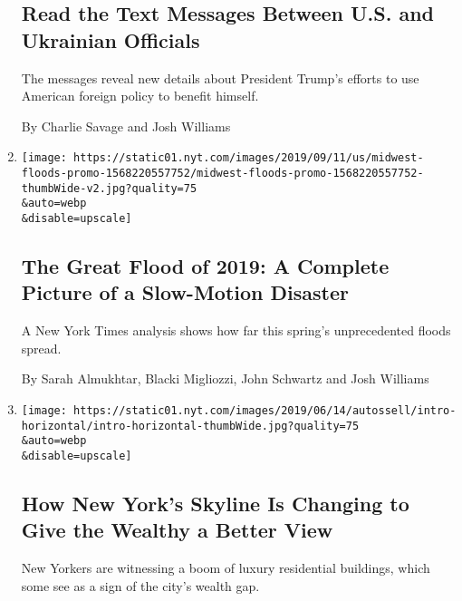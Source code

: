 \begin{enumerate}
  \hypertarget{read-the-text-messages-between-us-and-ukrainian-officials}{%
  \subsection{Read the Text Messages Between U.S. and Ukrainian
  Officials}\label{read-the-text-messages-between-us-and-ukrainian-officials}}

  The messages reveal new details about President Trump's efforts to use
  American foreign policy to benefit himself.

  By Charlie Savage and Josh Williams
\item
  \href{/interactive/2019/09/11/us/midwest-flooding.html}{}

  \texttt{[image: https://static01.nyt.com/images/2019/09/11/us/midwest-floods-promo-1568220557752/midwest-floods-promo-1568220557752-thumbWide-v2.jpg?quality=75\\\&auto=webp\\\&disable=upscale]}

  \hypertarget{the-great-flood-of-2019-a-complete-picture-of-a-slow-motion-disaster}{%
  \subsection{The Great Flood of 2019: A Complete Picture of a
  Slow-Motion
  Disaster}\label{the-great-flood-of-2019-a-complete-picture-of-a-slow-motion-disaster}}

  A New York Times analysis shows how far this spring's unprecedented
  floods spread.

  By Sarah Almukhtar, Blacki Migliozzi, John Schwartz and Josh Williams
\item
  \href{/interactive/2019/06/14/nyregion/new-york-skyline-inequality.html}{}

  \texttt{[image: https://static01.nyt.com/images/2019/06/14/autossell/intro-horizontal/intro-horizontal-thumbWide.jpg?quality=75\\\&auto=webp\\\&disable=upscale]}

  \hypertarget{how-new-yorks-skyline-is-changing-to-give-the-wealthy-a-better-view}{%
  \subsection{How New York's Skyline Is Changing to Give the Wealthy a
  Better
  View}\label{how-new-yorks-skyline-is-changing-to-give-the-wealthy-a-better-view}}

  New Yorkers are witnessing a boom of luxury residential buildings,
  which some see as a sign of the city's wealth gap.


\end{enumerate}
